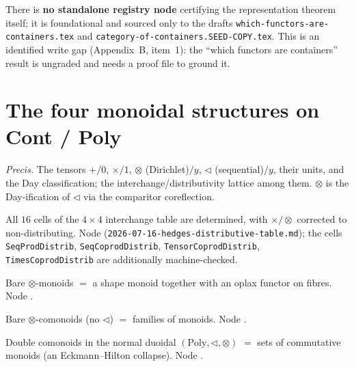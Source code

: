 \documentclass[11pt]{article}
\begin{document}
\begin{flag}
There is \textbf{no standalone registry node} certifying the representation theorem itself; it is
foundational and sourced only to the drafts \texttt{which-functors-are-containers.tex} and
\texttt{category-of-containers.SEED-COPY.tex}. This is an identified write gap (Appendix~B, item~1):
the ``which functors are containers'' result is ungraded and needs a proof file to ground it.
\end{flag}

\section{The four monoidal structures on Cont / Poly}
\emph{Precis.} The tensors $+/0$, $\times/1$, $\otimes$ (Dirichlet)$/y$, $\triangleleft$
(sequential)$/y$, their units, and the Day classification; the interchange/distributivity lattice
among them. $\otimes$ is the Day-ification of $\triangleleft$ via the comparitor coreflection.

\begin{theorem}
All $16$ cells of the $4\times4$ interchange table are determined, with $\times/\otimes$ corrected
to non-distributing. Node 
(\texttt{2026-07-16-hedges-distributive-table.md}); the cells \texttt{SeqProdDistrib},
\texttt{SeqCoprodDistrib}, \texttt{TensorCoprodDistrib}, \texttt{TimesCoprodDistrib} are
additionally machine-checked.
\end{theorem}

\begin{proposition}
Bare $\otimes$-monoids $=$ a shape monoid together with an oplax functor on fibres. Node
.
\end{proposition}

\begin{proposition}
Bare $\otimes$-comonoids (no $\triangleleft$) $=$ families of monoids. Node
.
\end{proposition}

\begin{proposition}
Double comonoids in the normal duoidal $(\mathrm{Poly},\triangleleft,\otimes)$ $=$ sets of
commutative monoids (an Eckmann--Hilton collapse). Node .
\end{proposition}
\end{document}
